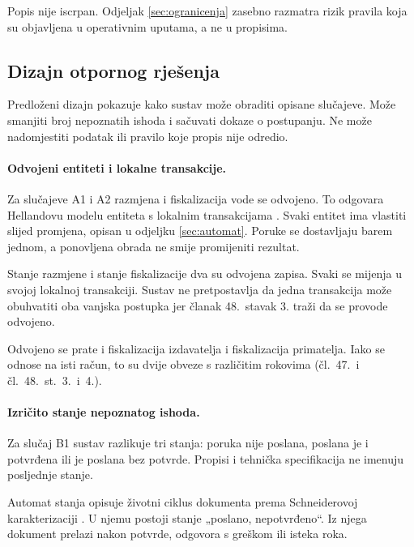 Popis nije iscrpan. Odjeljak \ref{sec:ogranicenja} zasebno razmatra rizik
pravila koja su objavljena u operativnim uputama, a ne u propisima.

\subsection{Dizajn otpornog rješenja}
\label{sec:dizajn}

Predloženi dizajn pokazuje kako sustav može obraditi opisane slučajeve.
Može smanjiti broj nepoznatih ishoda i sačuvati dokaze o postupanju. Ne
može nadomjestiti podatak ili pravilo koje propis nije odredio.

\paragraph{Odvojeni entiteti i lokalne transakcije.}
Za slučajeve A1 i A2 razmjena i fiskalizacija vode se odvojeno. To odgovara
Hellandovu modelu entiteta s lokalnim transakcijama
\cite{helland2007lifebeyond}. Svaki entitet ima vlastiti slijed promjena,
opisan u odjeljku \ref{sec:automat}. Poruke se dostavljaju barem jednom, a
ponovljena obrada ne smije promijeniti rezultat.

Stanje razmjene i stanje fiskalizacije dva su odvojena zapisa. Svaki se
mijenja u svojoj lokalnoj transakciji. Sustav ne pretpostavlja da jedna
transakcija može obuhvatiti oba vanjska postupka jer članak 48.\ stavak 3.
traži da se provode odvojeno.

Odvojeno se prate i fiskalizacija izdavatelja i fiskalizacija primatelja.
Iako se odnose na isti račun, to su dvije obveze s različitim rokovima
(čl.~47.\ i čl.~48.~st.~3.\ i~4.).

\paragraph{Izričito stanje nepoznatog ishoda.}
Za slučaj B1 sustav razlikuje tri stanja: poruka nije poslana, poslana je i
potvrđena ili je poslana bez potvrde. Propisi i tehnička specifikacija ne
imenuju posljednje stanje.

Automat stanja opisuje životni ciklus dokumenta prema Schneiderovoj
karakterizaciji \cite{schneider1990statemachine}. U njemu postoji stanje
„poslano, nepotvrđeno“. Iz njega dokument prelazi nakon potvrde, odgovora s
greškom ili isteka roka.

